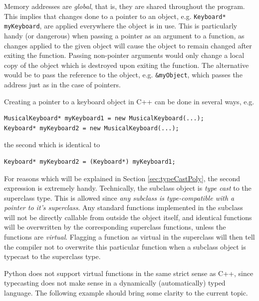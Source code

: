 Memory addresses are \textit{global}, that is, they are shared throughout the program. This implies that changes done to a pointer to an object, e.g. \verb+Keyboard* myKeyboard+, are applied everywhere the object is in use. This is particularly handy (or dangerous) when passing a pointer as an argument to a function, as changes applied to the given object will cause the object to remain changed after exiting the function. Passing non-pointer arguments would only change a local copy of the object which is destroyed upon exiting the function. The alternative would be to pass the reference to the object, e.g. \verb+&myObject+, which passes the address just as in the case of pointers. 

Creating a pointer to a keyboard object in C++ can be done in several ways, e.g. 
\begin{lstlisting}
MusicalKeyboard* myKeyboard1 = new MusicalKeyboard(...);
Keyboard* myKeyboard2 = new MusicalKeyboard(...);
\end{lstlisting}

the second which is identical to 

\begin{lstlisting}
Keyboard* myKeyboard2 = (Keyboard*) myKeyboard1;
\end{lstlisting}

For reasons which will be explained in Section \ref{sec:typeCastPoly}, the second expression is extremely handy. Technically, the subclass object is \textit{type cast} to the superclass type. This is allowed since \textit{any subclass is type-compatible with a pointer to it's superclass}. Any standard functions implemented in the subclass will not be directly callable from outside the object itself, and identical functions will be overwritten by the corresponding superclass functions, unless the functions are \textit{virtual}. Flagging a function as virtual in the superclass will then tell the compiler not to overwrite this particular function when a subclass object is typecast to the superclass type.

Python does not support virtual functions in the same strict sense as C++, since typecasting does not make sense in a dynamically (automatically) typed language. The following example should bring some clarity to the current topic.

\vspace{0.5 cm}

\clearpage


